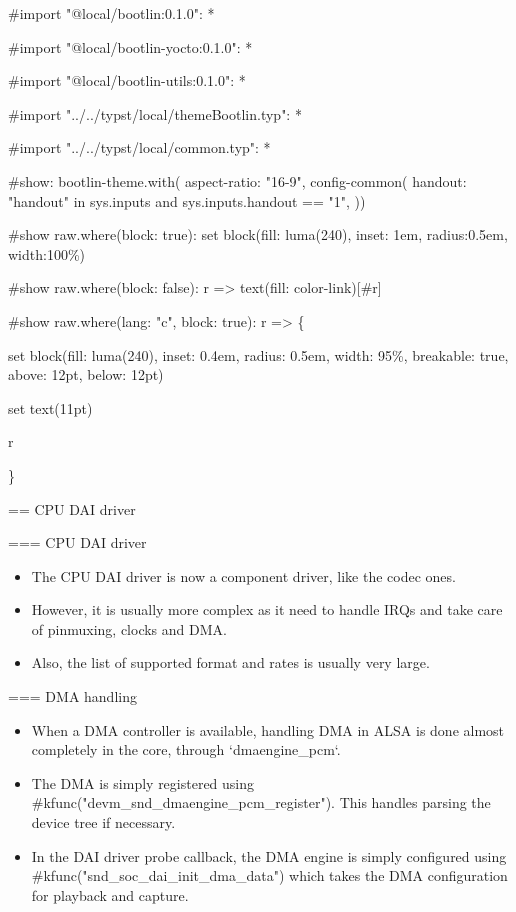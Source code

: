 #import "@local/bootlin:0.1.0": * 

#import "@local/bootlin-yocto:0.1.0": *

#import "@local/bootlin-utils:0.1.0": *

#import "../../typst/local/themeBootlin.typ": *

#import "../../typst/local/common.typ": *

#show: bootlin-theme.with(
  aspect-ratio: "16-9",
config-common(
  handout: "handout" in sys.inputs and sys.inputs.handout == "1",
))

#show raw.where(block: true): set block(fill: luma(240), inset: 1em, radius:0.5em, width:100\%) 

#show raw.where(block: false): r => { text(fill: color-link)[#r] } 

#show raw.where(lang: "c", block: true): r => \{

set block(fill: luma(240),
inset: 0.4em,
radius: 0.5em,
width: 95\%, breakable: true, above: 12pt, below: 12pt)

set text(11pt)

r

\} 

== CPU DAI driver

=== {CPU DAI driver}
  \begin{itemize}
  \item The CPU DAI driver is now a component driver, like the codec
    ones.
  \item However, it is usually more complex as it need to handle IRQs
    and take care of pinmuxing, clocks and DMA.
  \item Also, the list of supported format and rates is usually very
    large.
  \end{itemize}


=== {DMA handling}
  \begin{itemize}
  \item When a DMA controller is available, handling DMA in ALSA is
    done almost completely in the core, through `dmaengine_pcm`.
  \item The DMA is simply registered using
    #kfunc("devm_snd_dmaengine_pcm_register"). This handles parsing the
    device tree if necessary.
  \item In the DAI driver probe callback, the DMA engine is simply
    configured using #kfunc("snd_soc_dai_init_dma_data") which takes the
    DMA configuration for playback and capture.
  \end{itemize}


